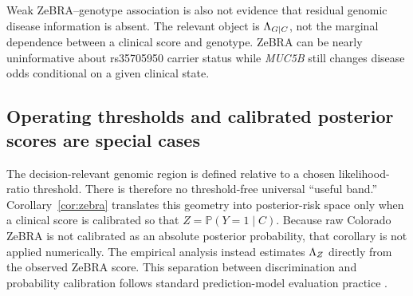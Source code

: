 Weak ZeBRA--genotype association is also not evidence that residual genomic disease information is absent. The relevant object is $\Lambda_{G\mid C}$, not the marginal dependence between a clinical score and genotype. ZeBRA can be nearly uninformative about rs35705950 carrier status while \textit{MUC5B} still changes disease odds conditional on a given clinical state.

\subsection{Operating thresholds and calibrated posterior scores are special cases}

The decision-relevant genomic region is defined relative to a chosen likelihood-ratio threshold. There is therefore no threshold-free universal ``useful band.'' Corollary~\ref{cor:zebra} translates this geometry into posterior-risk space only when a clinical score is calibrated so that $Z=\mathbb{P}(Y=1\mid C)$. Because raw Colorado ZeBRA is not calibrated as an absolute posterior probability, that corollary is not applied numerically. The empirical analysis instead estimates $\Lambda_Z$ directly from the observed ZeBRA score. This separation between discrimination and probability calibration follows standard prediction-model evaluation practice \cite{VanCalster2019}.
